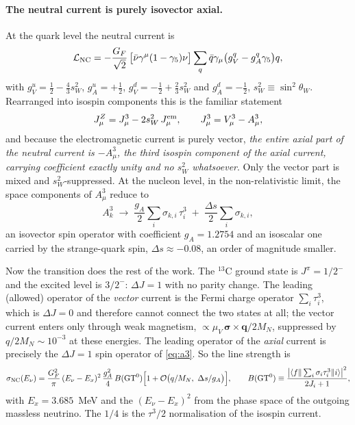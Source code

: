 \documentclass[aps,prd,superscriptaddress,nofootinbib,longbibliography,notitlepage,11pt]{revtex4-2}
\newcommand{\sw}{\sin^2\theta_W}
\begin{document}
\paragraph{The neutral current is purely isovector axial.}
At the quark level the neutral current is
\begin{equation}
\mathcal{L}_{\rm NC}=-\frac{G_F}{\sqrt2}\,
\big[\bar\nu\gamma^\mu(1-\gamma_5)\nu\big]
\sum_q\bar q\gamma_\mu\big(g_V^q-g_A^q\gamma_5\big)q,
\label{eq:lnc}
\end{equation}
with $g_V^u=\tfrac12-\tfrac43 s_W^2$, $g_A^u=+\tfrac12$, $g_V^d=-\tfrac12+\tfrac23 s_W^2$
and $g_A^d=-\tfrac12$, $s_W^2\equiv\sw$.  Rearranged into isospin components this is the
familiar statement
\begin{equation}
J_\mu^{Z}=J_\mu^{3}-2s_W^2\,J_\mu^{\rm em},
\qquad J_\mu^{3}=V_\mu^{3}-A_\mu^{3},
\label{eq:jz}
\end{equation}
and because the electromagnetic current is purely vector, \emph{the entire axial part of the
neutral current is $-A_\mu^{3}$, the third isospin component of the axial current, carrying
coefficient exactly unity and no $s_W^2$ whatsoever}.  Only the vector part is mixed and
$s_W^2$-suppressed.  At the nucleon level, in the non-relativistic limit, the space
components of $A^3_\mu$ reduce to
\begin{equation}
A^{3}_{k}\;\longrightarrow\;\frac{g_A}{2}\sum_i\sigma_{k,i}\,\tau^3_i
\;+\;\frac{\Delta s}{2}\sum_i\sigma_{k,i},
\label{eq:a3}
\end{equation}
an isovector spin operator with coefficient $g_A=1.2754$ and an isoscalar one carried by
the strange-quark spin, $\Delta s\approx-0.08$, an order of magnitude smaller.

Now the transition does the rest of the work.  The $^{13}$C ground state is $J^\pi=1/2^-$
and the excited level is $3/2^-$: $\Delta J=1$ with no parity change.  The leading
(allowed) operator of the \emph{vector} current is the Fermi charge operator
$\sum_i\tau^3_i$, which is $\Delta J=0$ and therefore cannot connect the two states at all;
the vector current enters only through weak magnetism, $\propto\mu_V\,\bm\sigma\times\bm q/2M_N$,
suppressed by $q/2M_N\sim10^{-3}$ at these energies.  The leading operator of the
\emph{axial} current is precisely the $\Delta J=1$ spin operator of \cref{eq:a3}.  So the
line strength is
\begin{equation}
\sigma_{\rm NC}(E_\nu)=\frac{G_F^2}{\pi}\,(E_\nu-E_x)^2\,\frac{g_A^2}{4}\,B({\rm GT}^0)
\Big[1+\mathcal{O}\big(q/M_N,\ \Delta s/g_A\big)\Big],
\qquad
B({\rm GT}^0)\equiv\frac{\big|\langle f\|\sum_i\sigma_i\tau^3_i\|i\rangle\big|^2}{2J_i+1},
\label{eq:signc}
\end{equation}
with $E_x=3.685$~MeV and the $(E_\nu-E_x)^2$ from the phase space of the outgoing massless
neutrino.  The $1/4$ is the $\tau^3/2$ normalisation of the isospin current.
\end{document}
